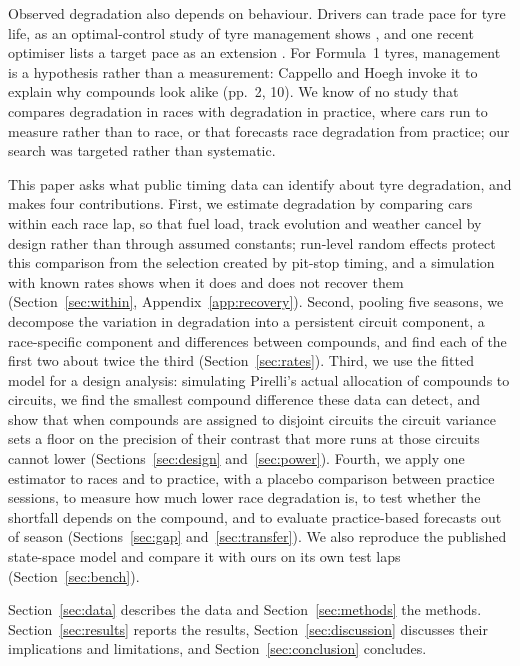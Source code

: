Observed degradation also depends on behaviour.
Drivers can trade pace for tyre life, as an optimal-control study of tyre management shows \citep{west2022tyre}, and one recent optimiser lists a target pace as an extension \citep{fieni2025towards}.
For Formula~1 tyres, management is a hypothesis rather than a measurement: Cappello and Hoegh invoke it to explain why compounds look alike (pp.~2, 10).
We know of no study that compares degradation in races with degradation in practice, where cars run to measure rather than to race, or that forecasts race degradation from practice; our search was targeted rather than systematic.

This paper asks what public timing data can identify about tyre degradation, and makes four contributions.
First, we estimate degradation by comparing cars within each race lap, so that fuel load, track evolution and weather cancel by design rather than through assumed constants; run-level random effects protect this comparison from the selection created by pit-stop timing, and a simulation with known rates shows when it does and does not recover them (Section~\ref{sec:within}, Appendix~\ref{app:recovery}).
Second, pooling five seasons, we decompose the variation in degradation into a persistent circuit component, a race-specific component and differences between compounds, and find each of the first two about twice the third (Section~\ref{sec:rates}).
Third, we use the fitted model for a design analysis: simulating Pirelli's actual allocation of compounds to circuits, we find the smallest compound difference these data can detect, and show that when compounds are assigned to disjoint circuits the circuit variance sets a floor on the precision of their contrast that more runs at those circuits cannot lower (Sections~\ref{sec:design} and~\ref{sec:power}).
Fourth, we apply one estimator to races and to practice, with a placebo comparison between practice sessions, to measure how much lower race degradation is, to test whether the shortfall depends on the compound, and to evaluate practice-based forecasts out of season (Sections~\ref{sec:gap} and~\ref{sec:transfer}).
We also reproduce the published state-space model and compare it with ours on its own test laps (Section~\ref{sec:bench}).

Section~\ref{sec:data} describes the data and Section~\ref{sec:methods} the methods.
Section~\ref{sec:results} reports the results, Section~\ref{sec:discussion} discusses their implications and limitations, and Section~\ref{sec:conclusion} concludes.
